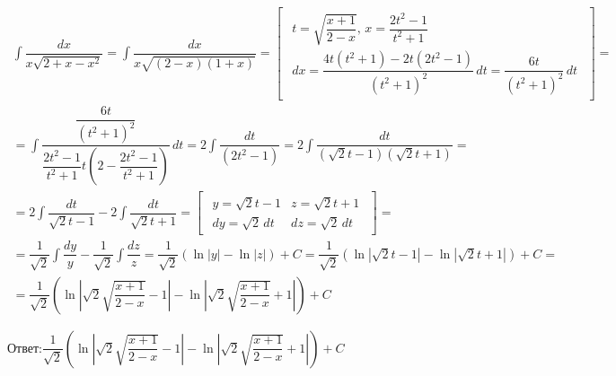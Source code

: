 \begin{eqnarray*}
  \int \dfrac{dx}{x \sqrt{2 + x - x^2}}
  = \int \dfrac{dx}{x \sqrt{(2 - x)(1 + x)}}
  = \begin{bmatrix}
    \begin{array}{l}
      t = \sqrt{\dfrac{x + 1}{2 - x}},\, x = \dfrac{2t^2 - 1}{t^2 + 1}\\
      dx = \dfrac{4t(t^2 + 1) - 2t(2t^2 - 1)}{(t^2 + 1)^2}\, dt
      = \dfrac{6t}{(t^2 + 1)^2}\, dt
    \end{array}
  \end{bmatrix}
  =\\= \int \dfrac{\dfrac{6t}{(t^2 + 1)^2}}{\dfrac{2t^2 - 1}{t^2 + 1} t (2 - \dfrac{2t^2 - 1}{t^2 + 1})}\, dt
  = 2 \int \dfrac{dt}{(2t^2 - 1)}
  = 2 \int \dfrac{dt}{(\sqrt{2}t - 1)(\sqrt{2}t + 1)}
  =\\= 2 \int \dfrac{dt}{\sqrt{2}t - 1}
  - 2 \int \dfrac{dt}{\sqrt{2}t + 1}
  = \begin{bmatrix}
    \begin{array}{ll}
      y = \sqrt{2}t - 1 & z = \sqrt{2}t + 1\\
      dy = \sqrt{2}\, dt& dz = \sqrt{2}\, dt
    \end{array}
  \end{bmatrix}
  =\\= \dfrac{1}{\sqrt{2}} \int \dfrac{dy}{y}
  - \dfrac{1}{\sqrt{2}} \int \dfrac{dz}{z}
  = \dfrac{1}{\sqrt{2}} (\ln|y| - \ln|z|)
  + C
  = \dfrac{1}{\sqrt{2}} (\ln|\sqrt{2}t - 1| - \ln|\sqrt{2}t + 1|)
  + C
  =\\= \dfrac{1}{\sqrt{2}} (\ln|\sqrt{2}\sqrt{\dfrac{x + 1}{2 - x}} - 1| - \ln|\sqrt{2}\sqrt{\dfrac{x + 1}{2 - x}} + 1|)
  + C
\end{eqnarray*}

\(
\textbf{Ответ:}
\dfrac{1}{\sqrt{2}} (\ln|\sqrt{2}\sqrt{\dfrac{x + 1}{2 - x}} - 1| - \ln|\sqrt{2}\sqrt{\dfrac{x + 1}{2 - x}} + 1|)
+ C
\)